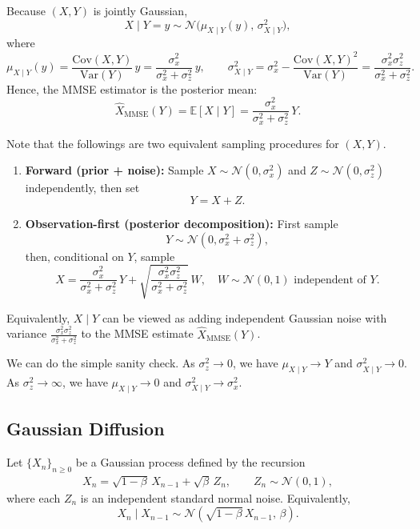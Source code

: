 \documentclass{article}
\begin{document}
Because $(X, Y)$ is jointly Gaussian,
\[
X \mid Y = y \sim \mathcal{N}\big( \mu_{X\mid Y}(y), \, \sigma^2_{X\mid Y} \big),
\]
where
\[
\mu_{X\mid Y}(y)
= \frac{\mathrm{Cov}(X,Y)}{\mathrm{Var}(Y)}\, y
= \frac{\sigma_x^2}{\sigma_x^2 + \sigma_z^2}\, y,
\qquad
\sigma^2_{X\mid Y}
= \sigma_x^2 - \frac{\mathrm{Cov}(X,Y)^2}{\mathrm{Var}(Y)}
= \frac{\sigma_x^2 \sigma_z^2}{\sigma_x^2 + \sigma_z^2}.
\]
Hence, the MMSE estimator is the posterior mean:
\[
\widehat{X}_{\mathrm{MMSE}}(Y)
= \mathbb{E}[X \mid Y]
= \frac{\sigma_x^2}{\sigma_x^2 + \sigma_z^2} \, Y.
\]

Note that the followings are two equivalent sampling procedures for $(X, Y)$.
\begin{enumerate}
    \item \textbf{Forward (prior + noise):}  
    Sample $X \sim \mathcal{N}(0, \sigma_x^2)$ and $Z \sim \mathcal{N}(0, \sigma_z^2)$ independently, then set
    \[
    Y = X + Z.
    \]
    
    \item \textbf{Observation-first (posterior decomposition):}  
    First sample 
    \[
    Y \sim \mathcal{N}(0, \sigma_x^2 + \sigma_z^2),
    \]
    then, conditional on $Y$, sample
    \[
    X = \frac{\sigma_x^2}{\sigma_x^2 + \sigma_z^2}\, Y
      + \sqrt{\frac{\sigma_x^2 \sigma_z^2}{\sigma_x^2 + \sigma_z^2}}\, W,
    \quad W \sim \mathcal{N}(0,1)
    \text{ independent of } Y.
    \]
\end{enumerate}
Equivalently, $X \mid Y$ can be viewed as adding independent Gaussian noise with variance 
$\frac{\sigma_x^2 \sigma_z^2}{\sigma_x^2 + \sigma_z^2}$ 
to the MMSE estimate $\widehat{X}_{\mathrm{MMSE}}(Y)$.

We can do the simple sanity check.
As $\sigma_z^2 \to 0$, we have $\mu_{X\mid Y} \to Y$ and $\sigma^2_{X\mid Y} \to 0$.  
As $\sigma_z^2 \to \infty$, we have $\mu_{X\mid Y} \to 0$ and $\sigma^2_{X\mid Y} \to \sigma_x^2$.



\subsection{Gaussian Diffusion}
Let $\{X_n\}_{n\ge0}$ be a Gaussian process defined by the recursion
\begin{align}
    X_n = \sqrt{1 - \beta}\, X_{n-1} + \sqrt{\beta}\, Z_n, \qquad 
    Z_n \sim \mathcal{N}(0,1),
\end{align}
where each $Z_n$ is an independent standard normal noise.
Equivalently,
\[
X_n \mid X_{n-1} \sim \mathcal{N}\!\left(\sqrt{1-\beta}\,X_{n-1},\, \beta\right).
\]
\end{document}
